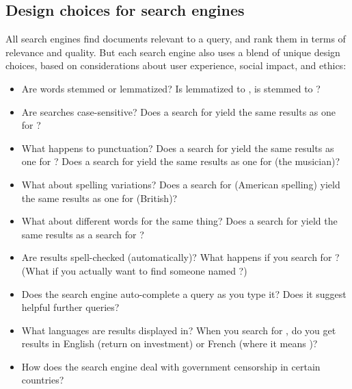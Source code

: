 \subsection{Design choices for search engines}

All search engines find documents relevant to a query, and rank them in terms of relevance and quality.  But each search engine also uses a blend of unique design choices, based on considerations about user experience, social impact, and ethics:

\begin{itemize}

\item Are words stemmed or lemmatized?   Is  lemmatized to , is  stemmed to ?

\item Are searches case-sensitive?  Does a search for  yield the same results as one for ?

\item What happens to punctuation?  Does a search for  yield the same results as one for ?  Does a search for  yield the same results as one for  (the musician)?

\item What about spelling variations?  Does a search for  (American spelling) yield the same results as one for  (British)?

\item What about different words for the same thing?  Does a search for  yield the same results as a search for ? 

\item Are results spell-checked (automatically)?  What happens if you search for ?  (What if you actually want to find someone named ?)

\item Does the search engine auto-complete a query as you type it?  Does it suggest helpful further queries?

\item What languages are results displayed in?  When you search for , do you get results in English (return on investment) or French (where it means )?

\item How does the search engine deal with government censorship in certain countries?


\end{itemize}
